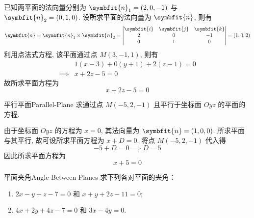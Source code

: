 \begin{solution}
    已知两平面的法向量分别为 $\symbfit{n}_1 = (2, 0, -1)$ 与 $\symbfit{n}_2 = (0, 1, 0)$. 设所求平面的法向量为 $\symbfit{n}$, 则有
    \begin{equation*}
        \symbfit{n} = \symbfit{n}_1 \times \symbfit{n}_2 = \begin{vmatrix} \symbfit{i} & \symbfit{j} & \symbfit{k} \\ 2 & 0 & -1 \\ 0 & 1 & 0 \end{vmatrix} = (1, 0, 2)
    \end{equation*}
    利用点法式方程, 该平面通过点 $M(3, -1, 1)$, 则有
    \begin{equation*}
        \begin{aligned}
                     & 1(x - 3) + 0(y + 1) + 2(z - 1) = 0 \\
            \implies & x + 2z - 5 = 0
        \end{aligned}
    \end{equation*}
    故所求平面方程为
    \begin{equation*}
        \boxed{x + 2z - 5 = 0}
    \end{equation*}
\end{solution}

\begin{problem}{平行平面}{Parallel-Plane}
    求通过点 $M(-5, 2, -1)$ 且平行于坐标面 $Oyz$ 的平面的方程.
\end{problem}

\begin{solution}
    由于坐标面 $Oyz$ 的方程为 $x = 0$, 其法向量为 $\symbfit{n} = (1, 0, 0)$. 所求平面与其平行, 故可设所求平面方程为 $x + D = 0$. 将点 $M(-5, 2, -1)$ 代入得
    \begin{equation*}
        -5 + D = 0 \implies D = 5
    \end{equation*}
    因此所求平面方程为
    \begin{equation*}
        \boxed{x + 5 = 0}
    \end{equation*}
\end{solution}

\begin{problem}{平面夹角}{Angle-Between-Planes}
    求下列各对平面的夹角：
    \begin{enumerate}
        \item $2x - y + z - 7 = 0$ 和 $x + y + 2z - 11 = 0$;
        \item $4x + 2y + 4z - 7 = 0$ 和 $3x - 4y = 0$.
    \end{enumerate}
\end{problem}

